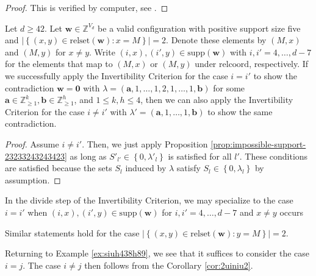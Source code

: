 \begin{proof}
    This is verified by computer, see \cite{ducrepo}.
\end{proof}

\begin{proposition}
    Let \( d\geq 42 \).
    Let \( \mathbf{w} \in \mathbb{Z}^{V_d} \) be a valid configuration with positive support size five and \( \lvert \left\{ (x,y) \in \mathrm{relset}(\mathbf{w}) : x = M \right\} \rvert = 2 \).
    Denote these elements by \( (M, x) \) and \( (M, y) \) for \( x \neq y \). Write \( (i,x), (i',y) \in \mathrm{supp}(\mathbf{w}) \) with \( i,i' = 4, \dots, d-7 \) for the elements that map to \( (M, x) \) or \( (M, y) \) under \( \mathrm{relcoord} \), respectively. If we successfully apply the Invertibility Criterion for the case \( i = i' \) to show the contradiction \( \mathbf{w} = \mathbf 0 \) with \( \lambda = (\mathbf{a},1,\dots,1, 2, 1, \dots, 1, \mathbf{b}) \)
    for some \(\mathbf{a} \in \mathbb{Z}^{k}_{\geq 1}, \mathbf{b} \in \mathbb{Z}^{h}_{\geq 1} \), and \( 1 \leq k,h \leq 4 \), then we can also apply the Invertibility Criterion for the case \( i \neq i' \) with \( \lambda' = (\mathbf{a},1, \dots, 1, \mathbf{b}) \)
    to show the same contradiction.
\end{proposition}

\begin{proof}
    Assume \( i \neq i' \). Then, we just apply Proposition \ref{prop:impossible-support-23233243243423} as long as \( S'_{l'} \in \left\{ 0, \lambda'_l \right\} \) is satisfied for all \( l' \). These conditions are satisfied because the sets \( S_l \) induced by \( \lambda \) satisfy \( S_{l} \in \left\{ 0, \lambda_l \right\} \) by assumption.
\end{proof}

\begin{corollary}\label{cor:2uiniu2}
    In the divide step of the Invertibility Criterion, we may specialize to the case \( i = i' \) when \( (i,x), (i',y) \in \mathrm{supp}(\mathbf{w}) \) for \( i,i' = 4, \dots, d-7 \) and \( x \neq y \) occurs 
\end{corollary}

Similar statements hold for the case \( \lvert \left\{ (x,y) \in \mathrm{relset}(\mathbf{w}) : y = M \right\} \rvert = 2 \).

\begin{example}
    Returning to Example \ref{ex:siuh438h89}, we see that it suffices to consider the case \( i = j \). The case \( i \neq j \) then follows from the Corollary \ref{cor:2uiniu2}.
\end{example}

